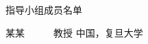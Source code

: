  \newpage
 \thispagestyle{empty}

 \vspace*{8mm} %
 \begin{center}

 {\Large 指导小组成员名单}\\

 \vspace{3cm}

\hspace{4cm} {\Large 某某~~~~~~教授} \hspace{1cm}  {中国，复旦大学　　}\\ %



 \end{center}

 \normalsize


%
